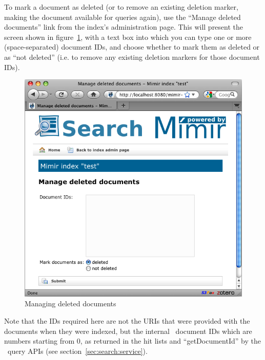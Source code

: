 To mark a document as deleted (or to remove an existing deletion marker, making
the document available for queries again), use the ``Manage deleted documents''
link from the index's administration page.  This will present the screen shown
in figure~\ref{fig:deleted-documents}, with a text box into which you can type
one or more (space-separated) document IDs, and choose whether to mark them as
deleted or as ``not deleted'' (i.e. to remove any existing deletion markers for
those document IDs).
%
\begin{figure}[htb!]
\begin{center}
\includegraphics[scale=0.5]{img/deleted-documents}
\end{center}
\caption{Managing deleted documents}
\label{fig:deleted-documents}
\end{figure}

Note that the IDs required here are not the URIs that were provided with the
documents when they were indexed, but the internal \Mimir\ document IDs which
are numbers starting from 0, as returned in the hit lists and ``getDocumentId''
by the \Mimir\ query APIs (see section~\ref{sec:search:service}).
